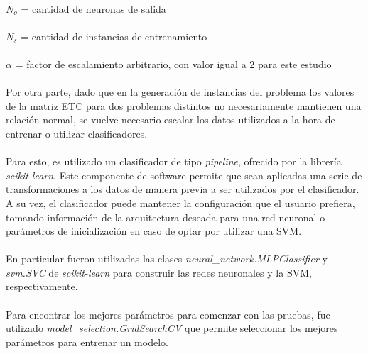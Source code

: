 \paragraph{}$N_o$ = cantidad de neuronas de salida
\paragraph{}$N_s$ = cantidad de instancias de entrenamiento
\paragraph{}$\alpha$ = factor de escalamiento arbitrario, con valor igual a 2 para este estudio

\paragraph{} Por otra parte, dado que en la generación de instancias del problema los valores de la matriz ETC para dos problemas distintos no necesariamente mantienen una relación normal, se vuelve necesario escalar los datos utilizados a la hora de entrenar o utilizar clasificadores.

\paragraph{} Para esto, es utilizado un clasificador de tipo \textit{pipeline}, ofrecido por la librería \textit{scikit-learn}. Este componente de software permite que sean aplicadas una serie de transformaciones a los datos de manera previa a ser utilizados por el clasificador. A su vez, el clasificador puede mantener la configuración que el usuario prefiera, tomando información de la arquitectura deseada para una red neuronal o parámetros de inicialización en caso de optar por utilizar una SVM. 

\paragraph{}En particular fueron utilizadas las clases \textit{neural\_network.MLPClassifier} y \textit{svm.SVC} de \textit{scikit-learn} para construir las redes neuronales y la SVM, respectivamente. 

\paragraph{} Para encontrar los mejores parámetros para comenzar con las pruebas, fue utilizado \textit{model\_selection.GridSearchCV} que permite seleccionar los mejores parámetros para entrenar un modelo. 

